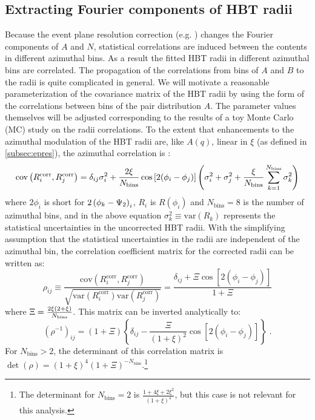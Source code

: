 \subsection{Extracting Fourier components of HBT radii}
\label{subsec:azi_correlations}

Because the event plane resolution correction (e.g. \Eqn{\ref{eq:a_corr}}) changes the Fourier components of $A$ and $N$, statistical correlations are induced between the contents in different azimuthal bins.
As a result the fitted HBT radii in different azimuthal bins are correlated.
The propagation of the correlations from bins of $A$ and $B$ to the radii is quite complicated in general.
We will motivate a reasonable parameterization of the covariance matrix of the HBT radii by using the form of the correlations between bins of the pair distribution $A$.
The parameter values themselves will be adjusted corresponding to the results of a toy Monte Carlo (MC) study on the radii correlations.
To the extent that enhancements to the azimuthal modulation of the HBT radii are, like $A(q)$, linear in $\xi$ (as defined in \cref{subsec:epres}), the azimuthal correlation is :
\begin{equation} \label{eq:azi_corr}
\textrm{cov}\left( R^\textrm{corr}_i, R^\textrm{corr}_j \right) = \delta_{ij} \sigma^2_{i} + \frac{2\xi}{N_\textrm{bins}} \cos\left[2(\phi_i - \phi_j) \right] \left( \sigma^2_{i} + \sigma^2_{j} + \frac{\xi}{N_\textrm{bins}} \sum_{k=1}^{N_\textrm{bins}} \sigma^2_{k} \right)
\end{equation}
where $2\phi_i$ is short for $2\left(\phi_{k}-\Psi_{2}\right)_i$, $R_i$ is $R\left(\phi_i\right)$ and $N_\textrm{bins}=8$ is the number of azimuthal bins, and in the above equation $\sigma^2_{k} \equiv \mathrm{var}(R_k)$ represents the statistical uncertainties in the uncorrected HBT radii. With the simplifying assumption that the statistical uncertainties in the radii are independent of the azimuthal bin, the correlation coefficient matrix for the corrected radii can be written as:
\begin{equation} \label{eq:corr_coeff_matrix}
  \rho_{ij} \equiv \frac{\mathrm{cov}\left( R^\textrm{corr}_i, R^\textrm{corr}_j \right)}{\sqrt{\mathrm{var}\left( R^\textrm{corr}_i \right) \mathrm{var}\left( R^\textrm{corr}_j \right)}}
  = \frac{\delta_{ij} + \Xi \cos{\left[2(\phi_i-\phi_j)\right]}}{1 + \Xi}
\end{equation}
where $\Xi = \frac{2\xi(2+\xi)}{N_\textrm{bins}}$.
This matrix can be inverted analytically to:
\begin{equation} \label{eq:corr_coeff_matrix_inv}
(\rho^{-1})_{ij} = \left(1 + \Xi\right)\left\{\delta_{ij} - \frac{\Xi}{(1+\xi)^2} \cos{\left[2(\phi_i-\phi_j)\right]}\right\} \;.
\end{equation}
For $N_\textrm{bins} > 2$, the determinant of this correlation matrix is $\det(\rho) = \left(1 + \xi\right)^{4}\left(1 + \Xi \right)^{-N_\textrm{bins}}$.\footnote{The determinant for $N_\textrm{bins} = 2$ is $\frac{1+4\xi+2\xi^2}{(1+\xi)^4}$, but this case is not relevant for this analysis.}

